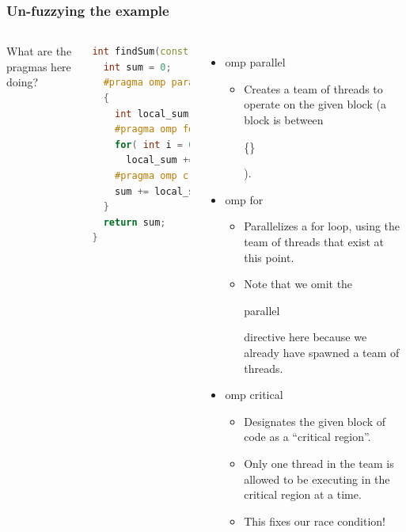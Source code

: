 \documentclass[table]{beamer}
\newcommand{\ttt}[1]{\begin{tt}#1\end{tt}}
\begin{document}
\begin{frame}[fragile]
    \frametitle{Un-fuzzying the example}
    \begin{columns}[c]
        \column{1.8in}
        \scriptsize What are the pragmas here doing?
\begin{lstlisting}[language=C++,basicstyle=\tiny]
int findSum(const vector<int> & list) {
  int sum = 0;
  #pragma omp parallel
  {
    int local_sum = 0;
    #pragma omp for
    for( int i = 0; i < list.size(); i++ )
      local_sum += list[i];
    #pragma omp critical
    sum += local_sum;
  }
  return sum;
}
\end{lstlisting}
        \column{2.8in}
        \begin{itemize}
        \item<2-> \scriptsize\ttt{omp parallel}
        \begin{itemize}
            \item<3-> \scriptsize Creates a team of threads to operate on 
            the given block (a block is between \ttt{\{\}}).
        \end{itemize}
        \item<4-> \scriptsize\ttt{omp for}
        \begin{itemize}
            \item<5-> \scriptsize Parallelizes a for loop, using the team 
            of threads that exist at this point.
            \item<6-> \scriptsize Note that we omit the \ttt{parallel} 
            directive here because we already have spawned a team of 
            threads.
        \end{itemize}
        \item<7-> \scriptsize\ttt{omp critical}
        \begin{itemize}
            \item<8-> \scriptsize Designates the given block of code as a 
            ``critical region''.
            \item<9-> \scriptsize Only one thread in the team is allowed to 
            be executing in the critical region at a time.
            \item<10-> \scriptsize This fixes our race condition!
        \end{itemize}
    \end{itemize}
    \end{columns}
\end{frame}
\end{document}
